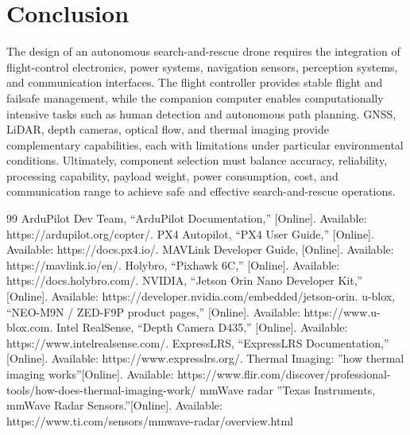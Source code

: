 \documentclass[conference]{IEEEtran}
\begin{document}
\section{Conclusion}
The design of an autonomous search-and-rescue drone requires the integration of flight-control electronics, power systems, navigation sensors, perception systems, and communication interfaces. The flight controller provides stable flight and failsafe management, while the companion computer enables computationally intensive tasks such as human detection and autonomous path planning. GNSS, LiDAR, depth cameras, optical flow, and thermal imaging provide complementary capabilities, each with limitations under particular environmental conditions. Ultimately, component selection must balance accuracy, reliability, processing capability, payload weight, power consumption, cost, and communication range to achieve safe and effective search-and-rescue operations.

\begin{thebibliography}{99}
 ArduPilot Dev Team, ``ArduPilot Documentation,'' [Online]. Available: https://ardupilot.org/copter/. 
 PX4 Autopilot, ``PX4 User Guide,'' [Online]. Available: https://docs.px4.io/. 
 MAVLink Developer Guide, [Online]. Available: https://mavlink.io/en/. 
 Holybro, ``Pixhawk 6C,'' [Online]. Available: https://docs.holybro.com/.
 NVIDIA, ``Jetson Orin Nano Developer Kit,'' [Online]. Available: https://developer.nvidia.com/embedded/jetson-orin.
 u-blox, ``NEO-M9N / ZED-F9P product pages,'' [Online]. Available: https://www.u-blox.com.
 Intel RealSense, ``Depth Camera D435,'' [Online]. Available: https://www.intelrealsense.com/.
 ExpressLRS, ``ExpressLRS Documentation,'' [Online]. Available: https://www.expresslrs.org/. 
Thermal Imaging: ''how thermal imaging works''[Online]. Available: https://www.flir.com/discover/professional-tools/how-does-thermal-imaging-work/
 mmWave radar ''Texas Instruments, mmWave Radar Sensors.''[Online]. Available: https://www.ti.com/sensors/mmwave-radar/overview.html
\end{thebibliography}
\end{document}
